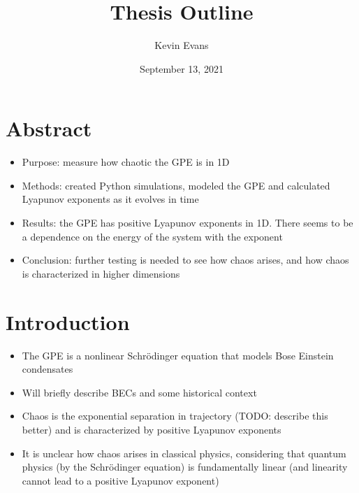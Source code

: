 \documentclass{homework}
\title{Thesis Outline}
\author{Kevin Evans}
\date{September 13, 2021}
\begin{document}
	\maketitle

	\section*{Abstract}
	\begin{itemize}
		\item Purpose: measure how chaotic the GPE is in 1D
		\item Methods: created Python simulations, modeled the GPE and calculated Lyapunov exponents as it evolves in time
		\item Results: the GPE has positive Lyapunov exponents in 1D. There seems to be a dependence on the energy of the system with the exponent
		\item Conclusion: further testing is needed to see how chaos arises, and how chaos is characterized in higher dimensions
	\end{itemize}
	
	\section{Introduction}
	\begin{itemize}
		\item The GPE is a nonlinear Schr\"odinger equation that models Bose Einstein condensates
		
		\item Will briefly describe BECs and some historical context
		\item Chaos is the exponential separation in trajectory (TODO: describe this better) and is characterized by positive Lyapunov exponents
		\item It is unclear how chaos arises in classical physics, considering that quantum physics (by the Schr\"odinger equation) is fundamentally linear (and linearity cannot lead to a positive Lyapunov exponent)
		
	\end{itemize}
\end{document}
